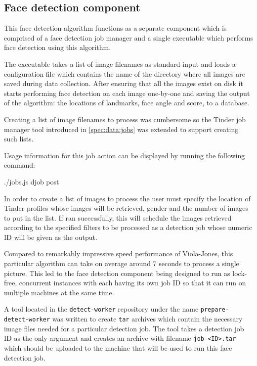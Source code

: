 \subsection{Face detection component}
\label{spec:fd:component}
This face detection algorithm functions as a separate component which is
comprised of a face detection job manager and a single executable which
performs face detection using this algorithm.

The executable takes a list of image filenames as standard input and loads a
configuration file which contains the name of the directory where all images
are saved during data collection. After ensuring that all the images exist on
disk it starts performing face detection on each image one-by-one and saving
the output of the algorithm: the locations of landmarks, face angle and score,
to a database.

Creating a list of image filenames to process was cumbersome so the Tinder job
manager tool introduced in \ref{spec:data:jobs} was extended to support
creating such lists. 

Usage information for this job action can be displayed by running the following
command:
\begin{logs}
./jobs.js djob post
\end{logs}

In order to create a list of images to process the user must specify the
location of Tinder profiles whose images will be retrieved, gender and the
number of images to put in the list. If ran successfully, this will schedule
the images retrieved according to the specified filters to be processed as a
detection job whose numeric ID will be given as the output.

Compared to remarkably impressive speed performance of Viola-Jones, this
particular algorithm can take on average around 7 seconds to process a single
picture. This led to the face detection component being designed to run as
lock-free, concurrent instances with each having its own job ID so that it can
run on multiple machines at the same time.

A tool located in the \texttt{detect-worker} repository under the name
\texttt{prepare-detect-worker} was written to create \texttt{tar} archives
which contain the necessary image files needed for a particular detection job.
The tool takes a detection job ID as the only argument and creates an archive
with filename \texttt{job-<ID>.tar} which should be uploaded to the machine
that will be used to run this face detection job.

